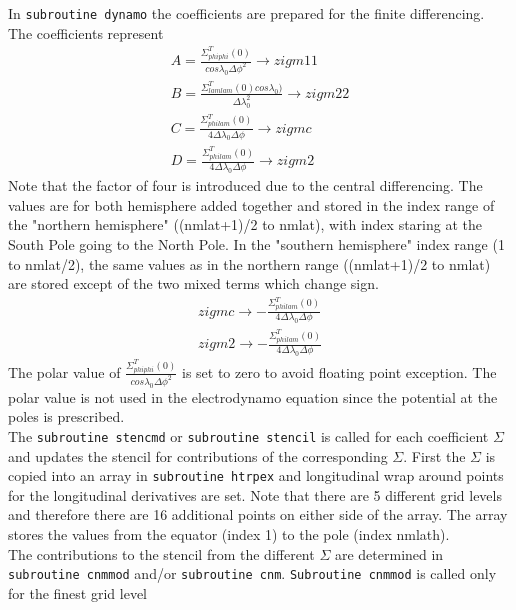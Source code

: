 %
In \texttt{subroutine dynamo} the coefficients are prepared for the
finite differencing. The coefficients represent 
% 
\begin{align}
A= \frac{\Sigma_{phi phi}^T(0)}{cos\lambda_0  \Delta \phi^2 }	   \rightarrow  zigm11\label{eq:sig_dif1}\\
B= \frac{\Sigma_{lam lam}^T(0) cos \lambda_0)}{\Delta \lambda_0^2} \rightarrow  zigm22\label{eq:sig_dif2} \\
C= \frac{\Sigma_{phi lam}^T(0)}{4\Delta \lambda_0 \Delta \phi }    \rightarrow  zigmc \label{eq:sig_dif3} \\
D= \frac{\Sigma_{phi lam}^T(0)}{4 \Delta \lambda_0 \Delta \phi}    \rightarrow  zigm2 \label{eq:sig_dif4} 
\end{align}
%
Note that the factor of four is introduced due to the 
central differencing. The values are for both hemisphere added 
together and stored in the index range of the "northern hemisphere" ((nmlat+1)/2 to nmlat), with
index staring at the South Pole going to the North Pole.
In the "southern hemisphere" index range (1 to nmlat/2), the same values as in the
northern range ((nmlat+1)/2 to nmlat) are stored except of the two mixed terms which change
sign.
% 
\begin{align}
 zigmc  \rightarrow -\frac{\Sigma_{phi lam}^T(0)}{4\Delta \lambda_0 \Delta \phi } \\
 zigm2  \rightarrow -\frac{\Sigma_{phi lam}^T(0)}{4 \Delta \lambda_0 \Delta \phi} 
\end{align}
%
The polar value of $\frac{\Sigma_{phi phi}^T(0)}{cos\lambda_0  \Delta \phi^2 }$
is set to zero to avoid floating point exception. The polar value is
not used in the electrodynamo equation since the potential at the poles is
prescribed. \\
%
The \texttt{subroutine stencmd} or \texttt{subroutine stencil} is called
for each coefficient $\Sigma$ and updates the stencil for contributions 
of the corresponding $\Sigma$. First the $\Sigma$ is copied into an
array in \texttt{subroutine htrpex} and longitudinal wrap around points for
the longitudinal derivatives are set. Note that there are 5 different grid
levels and therefore there are 16 additional points on either side of the
array. The array stores the values from the equator (index 1) to the pole
(index nmlath). \\
%
The contributions to the stencil from the different $\Sigma$ are
determined in \texttt{subroutine cnmmod} and/or \texttt{subroutine cnm}.
\texttt{Subroutine cnmmod} is called only for the finest grid level
